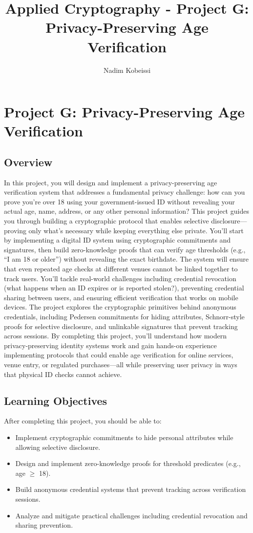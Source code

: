 \documentclass[10pt,a4paper,american]{exam}
\title{Applied Cryptography - Project G: Privacy-Preserving Age Verification}
\author{Nadim Kobeissi}
\begin{document}
\classhandoutheader
\section*{Project G: Privacy-Preserving Age Verification}

\subsection*{Overview}
In this project, you will design and implement a privacy-preserving age verification system that addresses a fundamental privacy challenge: how can you prove you're over 18 using your government-issued ID without revealing your actual age, name, address, or any other personal information? This project guides you through building a cryptographic protocol that enables selective disclosure—proving only what's necessary while keeping everything else private. You'll start by implementing a digital ID system using cryptographic commitments and signatures, then build zero-knowledge proofs that can verify age thresholds (e.g., ``I am 18 or older'') without revealing the exact birthdate. The system will ensure that even repeated age checks at different venues cannot be linked together to track users. You'll tackle real-world challenges including credential revocation (what happens when an ID expires or is reported stolen?), preventing credential sharing between users, and ensuring efficient verification that works on mobile devices. The project explores the cryptographic primitives behind anonymous credentials, including Pedersen commitments for hiding attributes, Schnorr-style proofs for selective disclosure, and unlinkable signatures that prevent tracking across sessions. By completing this project, you'll understand how modern privacy-preserving identity systems work and gain hands-on experience implementing protocols that could enable age verification for online services, venue entry, or regulated purchases—all while preserving user privacy in ways that physical ID checks cannot achieve.

\subsection*{Learning Objectives}
After completing this project, you should be able to:
\begin{itemize}
	\item Implement cryptographic commitments to hide personal attributes while allowing selective disclosure.
	\item Design and implement zero-knowledge proofs for threshold predicates (e.g., age $\geq$ 18).
	\item Build anonymous credential systems that prevent tracking across verification sessions.
	\item Analyze and mitigate practical challenges including credential revocation and sharing prevention.
\end{itemize}
\end{document}
